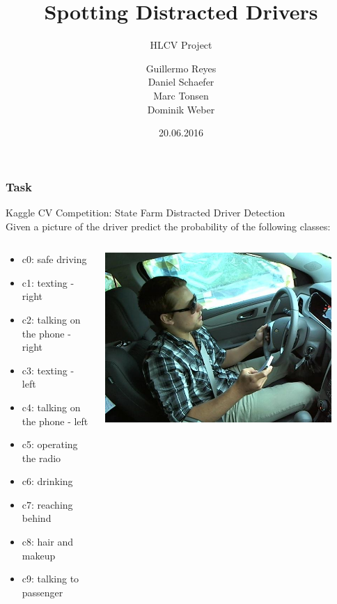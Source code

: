\documentclass{beamer}
\title{Spotting Distracted Drivers}
\subtitle{HLCV Project}
\author[Reyes, Schaefer, Tonsen, Weber]{Guillermo Reyes \\
	 Daniel Schaefer \\
	 Marc Tonsen \\
 Dominik Weber\\}
\institute[]{Saarland University}
\date{20.06.2016}
\begin{document}
	\begin{frame}
		\titlepage
	\end{frame}
	
	
	\begin{frame}
		\frametitle{Task}
		Kaggle CV Competition: State Farm Distracted Driver Detection \\
		Given a picture of the driver predict the probability of the following classes:
		
		\begin{columns}
			\begin{column}{0.5\textwidth}
				\begin{itemize}
					\item c0: safe driving
					\item c1: texting - right
					\item c2: talking on the phone - right
					\item c3: texting - left
					\item c4: talking on the phone - left
					\item c5: operating the radio
					\item c6: drinking
					\item c7: reaching behind
					\item c8: hair and makeup
					\item c9: talking to passenger			
				\end{itemize}
			\end{column}
			\begin{column}{0.5\textwidth}  %
				\begin{center}
					\includegraphics[width=0.9\textwidth]{img_6}
				\end{center}
			\end{column}
		\end{columns}
		
	\end{frame}
	
\end{document}
